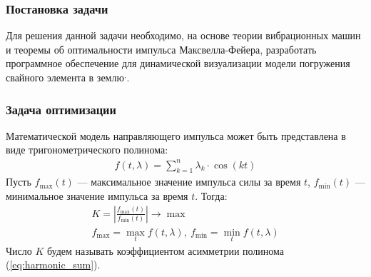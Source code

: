 \documentclass[10pt, pdf, hyperref={unicode}]{beamer}
\begin{document}
\begin{frame}
\begin{center}
\begin{minipage}[h]{0.97\linewidth}
\begin{minipage}[h]{0.29\linewidth}
\begin{figure}[h]
                    \end{figure}
                \end{minipage}
            \end{minipage}
        \end{center}
    \end{frame}


    \begin{frame}
        \frametitle{Постановка задачи}
        \begin{center}
            \begin{minipage}[h]{0.97\linewidth}
                Для решения данной задачи необходимо, на основе теории вибрационных машин и теоремы об оптимальности импульса Максвелла-Фейера,
                разработать программное обеспечение для динамической визуализации модели погружения свайного элемента в землю\footnotemark[1]${}^,$\footnotemark[2].
            \end{minipage}
        \end{center}
    \end{frame}


    \begin{frame}
        \frametitle{Задача оптимизации}
        \begin{center}
            \begin{minipage}[h]{0.97\linewidth}
                Математической модель направляющего импульса может быть представлена в виде тригонометрического полинома:
                \begin{equation}\label{eq:harmonic_sum}
                    \begin{gathered}
                        f(t, \lambda) = \sum\limits_{k = 1}^n \lambda_k \cdot \cos(kt)
                    \end{gathered}
                \end{equation}
                Пусть $f_{\max}(t)$ --- максимальное значение импульса силы за время $t$, $f_{\min}(t)$ --- минимальное значение импульса за время $t$. Тогда:
                \begin{equation}\label{eq:optim}
                    \begin{gathered}
                        K = \left| \frac{f_{\max}(t)}{f_{\min}(t)} \right| \rightarrow \max \\
                        f_{\max} = \max_t f(t, \lambda), \ f_{\min} = \min_t f(t, \lambda)
                    \end{gathered}
                \end{equation}
                Число $K$ будем называть коэффициентом асимметрии полинома (\ref{eq:harmonic_sum}).
            \end{minipage}
        \end{center}
    \end{frame}
\end{document}

